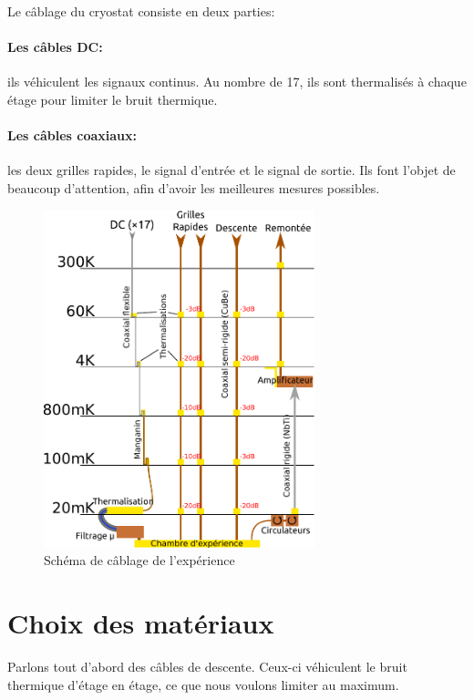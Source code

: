 \vspace*{-0.5cm}
Le câblage du cryostat consiste en deux parties: 
\paragraph*{Les câbles DC: }ils véhiculent les signaux continus. Au nombre de 17, ils sont thermalisés à chaque étage pour limiter le bruit thermique.
\paragraph*{Les câbles coaxiaux: }les deux grilles rapides, le signal d'entrée et le signal de sortie. Ils font l'objet de beaucoup d'attention, afin d'avoir les meilleures mesures possibles.

\vspace*{0.8cm}
\begin{figure}[h]
    \begin{center}
        \includegraphics[width=0.7\textwidth]{Images/Cablage_schema}
        \caption{Schéma de câblage de l'expérience}
        \label{cablage_schema}
    \end{center}
\end{figure}




\section{Choix des matériaux}
Parlons tout d'abord des câbles de descente. Ceux-ci véhiculent le bruit thermique d'étage en étage, ce que nous voulons limiter au maximum.

